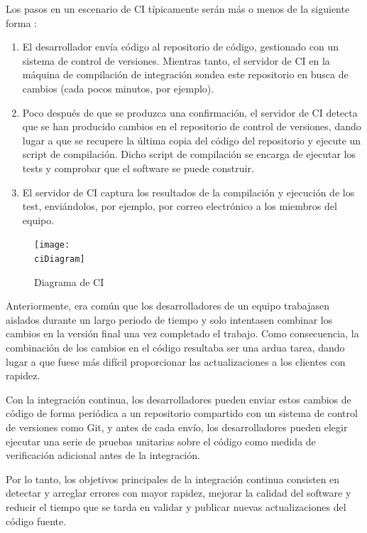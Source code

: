 Los pasos en un escenario de CI típicamente serán más o menos de la siguiente forma \cite{CI_Paul_Duvall}:
\begin{enumerate}
    \item El desarrollador envía código al repositorio de código, gestionado con un sistema de control de versiones. 
    Mientras tanto, el servidor de CI en la máquina de compilación de integración sondea este repositorio en busca de cambios (cada pocos minutos, por ejemplo).
    \item Poco después de que se produzca una confirmación, el servidor de CI detecta que se han producido cambios en el repositorio de control de versiones, dando lugar a que se recupere la última copia del código del repositorio y ejecute un script de compilación. Dicho script de compilación se encarga de ejecutar los tests y comprobar que el software se puede construir.
    \item El servidor de CI captura los resultados de la compilación y ejecución de los test, enviándolos, por ejemplo, por correo electrónico a los miembros del equipo.
\end{enumerate}

\begin{figure}[h]
    \centering
    \texttt{[image: \\ciDiagram]}
    \caption{Diagrama de CI}
\end{figure}

Anteriormente, era común que los desarrolladores de un equipo trabajasen aislados durante un largo periodo de tiempo y solo intentasen combinar los cambios en la versión final una vez completado el trabajo. Como consecuencia, la combinación de los cambios en el código resultaba ser una ardua tarea, dando lugar a que fuese más difícil proporcionar las actualizaciones a los clientes con rapidez.

Con la integración continua, los desarrolladores pueden enviar estos cambios de código de forma periódica a un repositorio compartido con un sistema de control de versiones como Git, y antes de cada envío, los desarrolladores pueden elegir ejecutar una serie de pruebas unitarias sobre el código como medida de verificación adicional antes de la integración.

Por lo tanto, los objetivos principales de la integración continua consisten en detectar y arreglar errores con mayor rapidez, mejorar la calidad del software y reducir el tiempo que se tarda en validar y publicar nuevas actualizaciones del código fuente.

